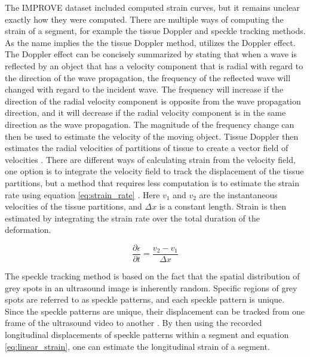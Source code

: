 The IMPROVE dataset included computed strain curves, but it remains unclear exactly how they were computed. There are multiple ways of computing the strain of a segment, for example the tissue Doppler and speckle tracking methods. As the name implies the the tissue Doppler method, utilizes the Doppler effect. The Doppler effect can be concisely summarized by stating that when a wave is reflected by an object that has a velocity component that is radial with regard to the direction of the wave propagation, the frequency of the reflected wave will changed with regard to the incident wave. The frequency will increase if the direction of the radial velocity component is opposite from the wave propagation direction, and it will decrease if the radial velocity component is in the same direction as the wave propagation. The magnitude of the frequency change can then be used to estimate the velocity of the moving object. Tissue Doppler then estimates the radial velocities of partitions of tissue to create a vector field of velocities \cite{strain_rate_imaging}. There are different ways of calculating strain from the velocity field, one option is to integrate the velocity field to track the displacement of the tissue partitions, but a method that requires less computation is to estimate the strain rate using equation \eqref{eq:strain_rate} \cite{myocardial_imaging}. Here $v_1$ and $v_2$ are the instantaneous velocities of the tissue partitions, and $\Delta x$ is a constant length. Strain is then estimated by integrating the strain rate over the total duration of the deformation. 

\begin{equation}
    \frac{\partial \epsilon}{\partial t} = \frac{v_2 - v_1}{\Delta x}
    \label{eq:strain_rate}
\end{equation}

The speckle tracking method is based on the fact that the spatial distribution of grey spots in an ultrasound image is inherently random. Specific regions of grey spots are referred to as speckle patterns, and each speckle pattern is unique. Since the speckle patterns are unique, their displacement can be tracked from one frame of the ultrasound video to another \cite{myocardial_imaging}. By then using the recorded longitudinal displacements of speckle patterns within a segment and equation \eqref{eq:linear_strain}, one can estimate the longitudinal strain of a segment.

